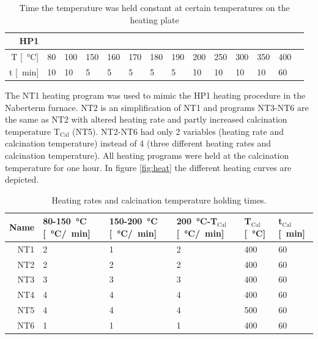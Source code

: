 \documentclass[a4paper]{article}
\newcommand{\td}[1]{\textbf{\textcolor{red}{#1}}}
\newcommand{\minutes}[1]{\SI{#1}{\minute}}
\newcommand{\oc}[1]{\SI{#1}{\degreeCelsius}}
\begin{document}
\begin{table}[h]
	\centering
	\begin{tabular}{rl ll ll ll ll ll ll }%
		HP1		&&&&&&&&&&&&&\\
		\hline
		T [\oc{}]	    &80		&100	&150	&160	&170 	&180	&190	&200	&250	&300	&350	&400	\\
		t [\minutes{}]	&10 	&10		&5 		&5 		&5 		&5 &5 &10 &10 &10 &10 &60 \\
		\hline
	\end{tabular}
	\caption{Time the temperature was held constant at certain temperatures on the heating plate}
	\label{tab:labtech}
\end{table}
%
The NT1 heating program was used to mimic the HP1 heating procedure in the Naberterm furnace. 
NT2 is an simplification of NT1 and programs NT3-NT6 are the same as NT2 with altered heating rate and partly increased calcination temperature T$_{\textrm{Cal}}$ (NT5).
NT2-NT6 had only 2 variables (heating rate and calcination temperature) instead of 4 (three different heating rates and calcination temperature). 
All heating programs were held at the calcination temperature for one hour.
In figure \ref{fig:heat} the different heating curves are depicted. 
%
%
\begin{table}[h]
	\centering
	\begin{tabular}{rl ll ll}%
		\hline\hline
		Name	&80-150\oc{} [\oc{}/\minutes{}]	&150-200\oc{} [\oc{}/\minutes{}]	&200\oc{}-T$_{\textrm{Cal}}$ [\oc{}/\minutes{}]	&T$_{\textrm{Cal}}$ [\oc{}] &t$_{\textrm{Cal}}$ [\minutes{}]	\\
		\hline
		NT1		&2					&1					&2				&400	&60  \\
		NT2		&2					&2					&2				&400	&60  \\
		NT3		&3					&3					&3				&400	&60  \\
		NT4		&4					&4					&4				&400	&60  \\
		NT5		&4					&4					&4				&500	&60  \\
		NT6		&1					&1					&1				&400	&60  \\
		\hline\hline
	\end{tabular}
	\caption{Heating rates and calcination temperature holding times. }
	\label{tab:nt}
\end{table}
\end{document}
